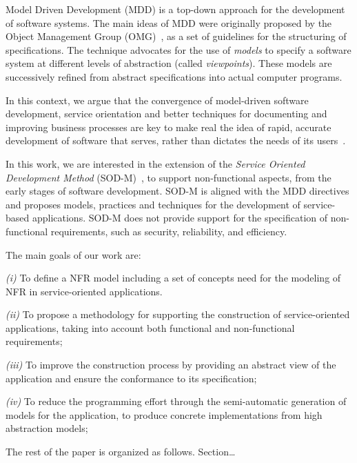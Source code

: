 \bigskip

Model Driven Development (MDD) is a top-down approach for the development of software systems. 
The main ideas of MDD were originally proposed by the Object Management Group (OMG)~\cite{mda}, as a set of guidelines for the structuring of specifications.
The technique advocates for the use of \textit{models} to specify a software system at different levels of abstraction (called \textit{viewpoints}). 
These models are successively refined from abstract specifications into actual computer programs.

In this context, we argue that the convergence of model-driven software development, service orientation and better techniques for documenting and improving business processes are key to make real the idea of rapid, accurate development of software that serves, rather than dictates the needs of its users~\cite{watson}. 

In this work, we are interested in the extension of the \textit{Service Oriented Development Method} (SOD-M)~\cite{decastro1}, to support non-functional aspects, from the early stages of software development.
SOD-M is aligned with the MDD directives and proposes models, practices and techniques for the development of service-based applications.
SOD-M does not provide support for the specification of non-functional requirements, such as
security, reliability, and efficiency. 

The main goals of our work are:
\begin{trivlist}
\item \textit{(i)} To define a NFR model including a set of concepts need for the modeling of NFR in service-oriented applications.
\item \textit{(ii)} To propose a methodology for supporting the construction of service-oriented applications, taking into account both functional and non-functional requirements;
\item \textit{(iii)} To improve the construction process by providing an abstract view of the application and ensure the conformance to its specification;
\item \textit{(iv)} To reduce the programming effort through the semi-automatic generation of  models for the application, to produce concrete implementations from high abstraction models;
\end{trivlist}

The rest of the paper is organized as follows. 
Section\dots





